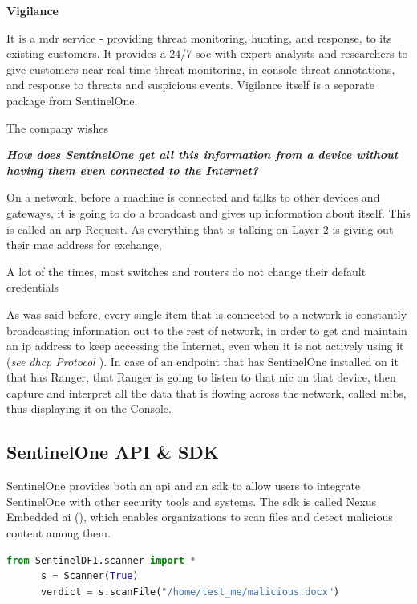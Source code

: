 \begin{multicols}{2}
      \textbf{Vigilance}

      It is a \acrshort{mdr} service - providing threat monitoring, hunting, and response, to its existing customers. It
      provides a 24/7 \acrshort{soc} with expert analysts and researchers to give customers near real-time threat monitoring,
      in-console threat annotations, and response to threats and suspicious events. Vigilance itself is a separate package from
      SentinelOne.

      The company wishes

      \textbf{\textit{How does SentinelOne get all this information from a device without having them even connected to the Internet?}}

      On a network, before a machine is connected and talks to other devices
      and gateways, it is going to do a broadcast and gives up information about itself. This is called an \acrshort{arp} Request.
      As everything that is talking on Layer 2 is giving out their \acrshort{mac} address for exchange,

      A lot of the times, most switches and routers do not change their default credentials

      As was said before, every single item that is connected to a network is constantly broadcasting information out to the rest of
      network, in order to get and maintain an \acrshort{ip} address to keep accessing the Internet, even when it is not actively using
      it (\textit{see \acrshort{dhcp} Protocol \cite{dhcpProcess}}). In case of an endpoint that has SentinelOne installed on it that
      has Ranger, that Ranger is going to listen to that \acrshort{nic} on that device, then capture and interpret all the data that
      is flowing across the network, called \acrshort{mib}s, thus displaying it on the Console.

      \subsection{SentinelOne API \& SDK}
      SentinelOne provides both an \acrshort{api} and an \acrshort{sdk} to allow users to integrate SentinelOne with other
      security tools and systems. The \acrshort{sdk} is called Nexus Embedded \acrshort{ai} (\textit{\cite{nexusSDK}}), which
      enables organizations to scan files and detect malicious content among them.
\end{multicols}

\begin{lstlisting}[language=Python, caption=SentinelOne SDK implementation]
      from SentinelDFI.scanner import *
      s = Scanner(True)
      verdict = s.scanFile("/home/test_me/malicious.docx")
\end{lstlisting}

